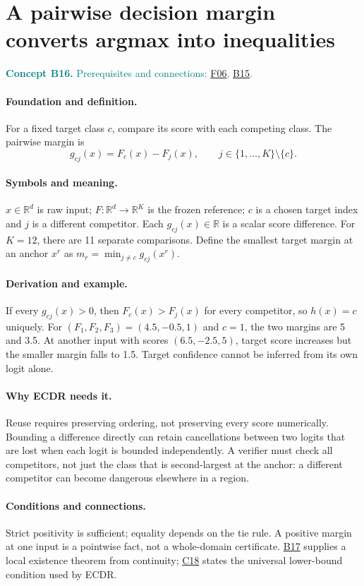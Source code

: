 \documentclass[11pt,a4paper]{article}
\newcommand{\R}{\mathbb R}
\newcommand{\conceptid}{Front matter}
\newcommand{\concept}[3]{\clearpage\renewcommand{\conceptid}{#1}%
\section{#2}\label{concept:#1}%
\textcolor{teal}{\textbf{Concept #1.} Prerequisites and connections: #3.}\par
\typeout{ECDR-CONCEPT-START #1 PAGE=\thepage}}
\begin{document}
\concept{B16}{A pairwise decision margin converts argmax into inequalities}{\hyperref[concept:F06]{F06}, \hyperref[concept:B15]{B15}}
\paragraph{Foundation and definition.}
For a fixed target class $c$, compare its score with each competing class.
The pairwise margin is
\[
 g_{cj}(x)=F_c(x)-F_j(x),\qquad j\in\{1,\ldots,K\}\setminus\{c\}.
\]
\paragraph{Symbols and meaning.}
$x\in\R^d$ is raw input; $F:\R^d\to\R^K$ is the frozen reference;
$c$ is a chosen target index and $j$ is a different competitor. Each
$g_{cj}(x)\in\R$ is a scalar score difference. For $K=12$, there are
11 separate comparisons. Define the smallest target margin at an anchor
$x^r$ as $m_r=\min_{j\ne c}g_{cj}(x^r)$.
\paragraph{Derivation and example.}
If every $g_{cj}(x)>0$, then $F_c(x)>F_j(x)$ for every competitor, so
$h(x)=c$ uniquely. For $(F_1,F_2,F_3)=(4.5,-0.5,1)$ and $c=1$,
the two margins are 5 and 3.5. At another input with scores
$(6.5,-2.5,5)$, target score increases but the smaller margin falls to
1.5. Target confidence cannot be inferred from its own logit alone.
\paragraph{Why ECDR needs it.}
Reuse requires preserving ordering, not preserving every score numerically.
Bounding a difference directly can retain cancellations between two logits
that are lost when each logit is bounded independently. A verifier must
check all competitors, not just the class that is second-largest at the
anchor: a different competitor can become dangerous elsewhere in a region.
\paragraph{Conditions and connections.}
Strict positivity is sufficient; equality depends on the tie rule.
A positive margin at one input is a pointwise fact, not a whole-domain
certificate. \hyperref[concept:B17]{B17} supplies a local existence theorem from continuity;
\hyperref[concept:C18]{C18} states the universal lower-bound condition used by ECDR.
\par\label{endconcept:B16}
\end{document}

